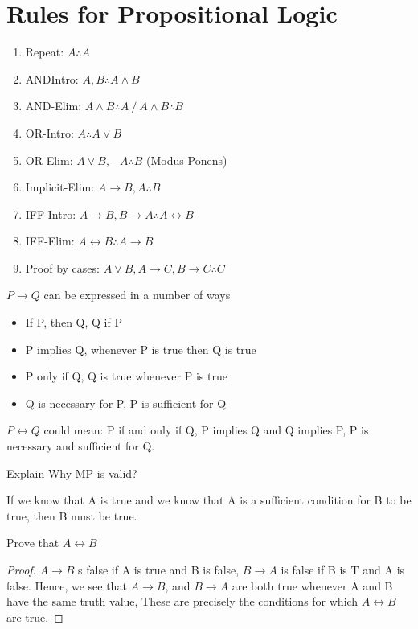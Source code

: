 \documentclass[../MATH-2000-Notes.tex]{subfiles}
\begin{document}
\section{Rules for Propositional Logic}
\begin{enumerate}
    \item Repeat: \(A \therefore A\)
    \item ANDIntro: \(A,B \therefore A\wedge B\)
    \item AND-Elim: \(A\wedge B \therefore A\ /\ A\wedge B \therefore B\)
    \item OR-Intro: \(A\therefore A \vee B\)
    \item OR-Elim: \(A\vee B, -A \therefore B\) (Modus Ponens)
    \item Implicit-Elim: \(A \rightarrow B, A \therefore B\)
    \item IFF-Intro: \(A \rightarrow B, B\rightarrow A \therefore A\leftrightarrow B\)
    \item IFF-Elim: \(A \leftrightarrow B \therefore A \rightarrow B\)
    \item Proof by cases: \(A\vee B, A\rightarrow C, B\rightarrow C \therefore C\)
\end{enumerate}
\(P \rightarrow Q\) can be expressed in a number of ways
\begin{itemize}
    \item If P, then Q, Q if P
    \item P implies Q, whenever P is true then Q is true
    \item P only if Q, Q is true whenever P is true
    \item Q is necessary for P, P is sufficient for Q
\end{itemize}
\(P \leftrightarrow Q\) could mean: P if and only if Q, P implies Q and Q implies P, P is necessary and sufficient for Q.
\begin{Questions}
    \item Explain Why MP is valid?
\end{Questions}
\begin{Answers}
    \item If we know that A is true and we know that A is a sufficient condition for B to be true, then B must be true. 
\end{Answers}
Prove that \(A\leftrightarrow B\)
\begin{proof}
    \(A \rightarrow B\) s false if A is true and B is false, \(B \rightarrow A\) is false if B is T and A is false. Hence, we see that \(A\rightarrow B\), and \(B\rightarrow A\) are both true whenever A and B have the same truth value, These are precisely the conditions for which \(A \leftrightarrow B\) are true. 
\end{proof}
\end{document}
